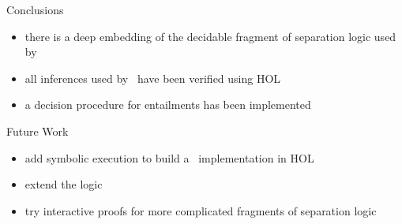 \begin{frame}
\begin{block}{Conclusions}
\begin{itemize}
\item there is a deep embedding of the decidable fragment of separation logic
  used by \smallfoot
\item all inferences used by \smallfoot\ have been verified using HOL
\item a decision procedure for entailments has been implemented
\end{itemize}
\end{block}

\begin{block}{Future Work}
\begin{itemize}
\item add symbolic execution to build a \smallfoot\ implementation in HOL
\item extend the logic
\item try interactive proofs for more complicated fragments of separation logic
\end{itemize}
\end{block}

\end{frame}



